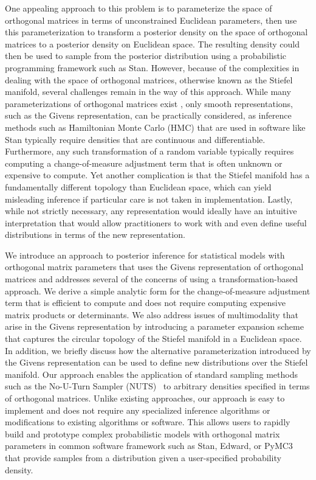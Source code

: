 \documentclass[ba]{imsart}
\numberwithin{equation}{section}
\theoremstyle{plain}
\begin{document}
\noindent One appealing approach to this problem is to parameterize the space of orthogonal matrices in terms of unconstrained Euclidean parameters, then use this parameterization to transform a posterior density on the space of orthogonal matrices to a posterior density on Euclidean space. The resulting density could then be used to sample from the posterior distribution using a probabilistic programming framework such as Stan. However, because of the complexities in dealing with the space of orthogonal matrices, otherwise known as the Stiefel manifold, several challenges remain in the way of this approach. While many parameterizations of orthogonal matrices exist \citep{anderson1987generation, shepard2015representation}, only smooth representations, such as the Givens representation, can be practically considered, as inference methods such as Hamiltonian Monte Carlo (HMC) that are used in software like Stan typically require densities that are continuous and differentiable. Furthermore, any such transformation of a random variable typically requires computing a change-of-measure adjustment term that is often unknown or expensive to compute. Yet another complication is that the Stiefel manifold has a fundamentally different topology than Euclidean space, which can yield misleading inference if particular care is not taken in implementation. Lastly, while not strictly necessary, any representation would ideally have an intuitive interpretation that would allow practitioners to work with and even define useful distributions in terms of the new representation.

\noindent We introduce an approach to posterior inference for statistical models with orthogonal matrix parameters that uses the Givens representation of orthogonal matrices and addresses several of the concerns of using a transformation-based approach. We derive a simple analytic form for the change-of-measure adjustment term that is efficient to compute and does not require computing expensive matrix products or determinants. We also address issues of multimodality that arise in the Givens representation by introducing a parameter expansion scheme that captures the circular topology of the Stiefel manifold in a Euclidean space. In addition, we briefly discuss how the alternative parameterization introduced by the Givens representation can be used to define new distributions over the Stiefel manifold. Our approach enables the application of standard sampling methods such as the No-U-Turn Sampler (NUTS)~\citep{hoffman2014no} to arbitrary densities specified in terms of orthogonal matrices. Unlike existing approaches, our approach is easy to implement and does not require any specialized inference algorithms or modifications to existing algorithms or software. This allows users to rapidly build and prototype complex probabilistic models with orthogonal matrix parameters in common software framework such as Stan, Edward, or PyMC3 that provide samples from a distribution given a user-specified probability density. 
\end{document}
